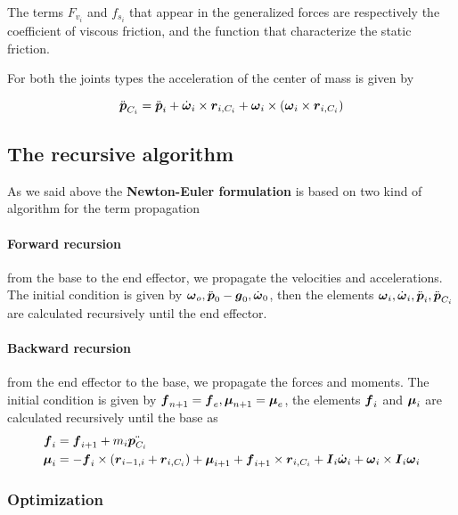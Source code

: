 The terms $F_{v_i}$ and $f_{s_i}$ that appear in the generalized forces are respectively the coefficient of viscous friction, and the function that characterize the static friction.

For both the joints types the acceleration of the center of mass is given by

\[
	\ddot{\boldsymbol{p}}_{C_i} = \ddot{\boldsymbol{p}}_i + \dot{\boldsymbol{\omega}}_i \times \boldsymbol{r}_{i,C_i} + \boldsymbol{\omega}_i \times (\boldsymbol{\omega}_i \times \boldsymbol{r}_{i,C_i})
\]

\subsection{The recursive algorithm}

As we said above the \textbf{Newton-Euler formulation} is based on two kind of algorithm for the term propagation

\paragraph{Forward recursion}

from the base to the end effector, we propagate the velocities and accelerations.
The initial condition is given by $\boldsymbol{\omega}_o, \ddot{\boldsymbol{p}}_0-\boldsymbol{g}_0, \dot{\boldsymbol{\omega}}_0$, then the elements $\boldsymbol{\omega}_i, \dot{\boldsymbol{\omega}}_i, \ddot{\boldsymbol{p}}_i, \ddot{\boldsymbol{p}}_{C_i}$ are calculated recursively until the end effector.

\paragraph{Backward recursion}

from the end effector to the base, we propagate the forces and moments.
The initial condition is given by $\boldsymbol{f}_{n+1} = \boldsymbol{f}_e, \boldsymbol{\mu}_{n+1} = \boldsymbol{\mu}_e$, the elements $\boldsymbol{f}_i$ and $\boldsymbol{\mu}_i$ are calculated recursively until the base as
\begin{align*}
    \boldsymbol{f}_i &= \boldsymbol{f}_{i+1} + m_i \ddot{\boldsymbol{p}_{C_i}} \\
	\boldsymbol{\mu}_i &= -\boldsymbol{f}_i \times \left( \boldsymbol{r}_{i-1,i} + \boldsymbol{r}_{i,C_i} \right) + \boldsymbol{\mu}_{i+1} + \boldsymbol{f}_{i+1} \times \boldsymbol{r}_{i,C_i} + \boldsymbol{I}_i \dot{\boldsymbol{\omega}}_i + \boldsymbol{\omega}_i \times \boldsymbol{I}_i \boldsymbol{\omega}_i
\end{align*}

\subsubsection{Optimization}

